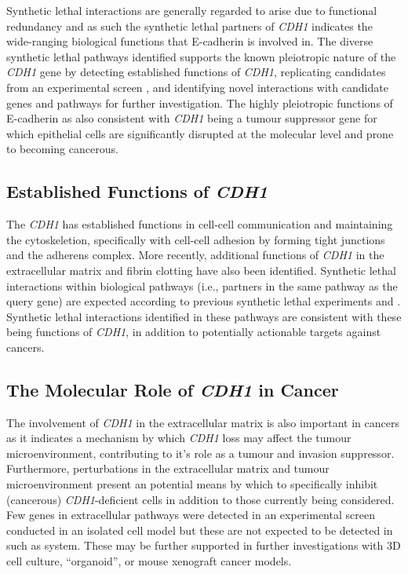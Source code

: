 Synthetic lethal interactions are generally regarded to arise due to functional redundancy \citep{Boone2007, Kaelin2005, Fece2015} and as such the synthetic lethal partners of \textit{CDH1} indicates the wide-ranging biological functions that E-cadherin is involved in. The diverse synthetic lethal pathways identified supports the known pleiotropic nature of the \textit{CDH1} gene by detecting established functions of \textit{CDH1}, replicating candidates from an experimental screen \citep{Telford2015}, and identifying novel interactions with candidate genes and pathways for further investigation. The highly pleiotropic functions of E-cadherin as also consistent with \textit{CDH1} being a tumour suppressor gene for which epithelial cells are significantly disrupted at the molecular level and prone to becoming cancerous.

\subsection{Established Functions of \textit{CDH1}}
\label{chapt6:function}

The \textit{CDH1} has established functions in cell-cell communication and maintaining the cytoskeletion, specifically with cell-cell adhesion by forming tight junctions and the adherens complex. More recently, additional functions of \textit{CDH1} in the extracellular matrix and fibrin clotting have also been identified. Synthetic lethal interactions within biological pathways (i.e., partners in the same pathway as the query gene) are expected according to previous synthetic lethal experiments and  \citep{Kelley2005, Boone2007}. Synthetic lethal interactions identified in these pathways are consistent with these being functions of \textit{CDH1}, in addition to potentially actionable targets against cancers.


\subsection{The Molecular Role of \textit{CDH1} in Cancer}
\label{chapt6:cancer}

The involvement of \textit{CDH1} in the extracellular matrix is also important in cancers as it indicates a mechanism by which \textit{CDH1} loss may affect the tumour microenvironment, contributing to it's role as a tumour and invasion suppressor. Furthermore, perturbations in the extracellular matrix and tumour microenvironment present an potential means by which to specifically inhibit (cancerous) \textit{CDH1}-deficient cells in addition to those currently being considered. Few genes in extracellular pathways were detected in an experimental screen \citep{Telford2015} conducted in an isolated cell model \citep{Chen2014} but these are not expected to be detected in such as system. These may be further supported in further investigations with 3D cell culture, ``organoid'', or mouse xenograft cancer models.

